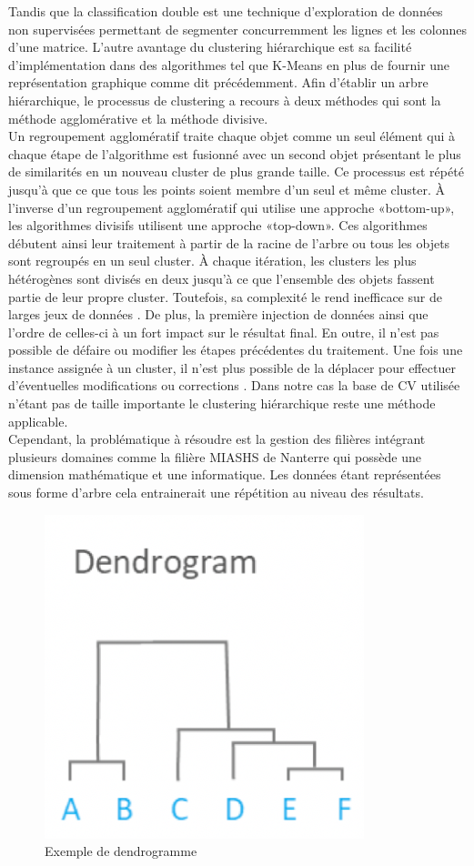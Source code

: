 \documentclass[memoire.tex]{subfiles}
\begin{document}
 Tandis que la classification double est une technique d'exploration de données non supervisées permettant de segmenter concurremment les lignes et les colonnes d'une matrice. L'autre avantage du clustering hiérarchique est sa facilité d'implémentation dans des algorithmes tel que K-Means en plus de fournir une représentation graphique comme dit précédemment. Afin d'établir un arbre hiérarchique, le processus de clustering a recours à deux méthodes qui sont la méthode agglomérative et la méthode divisive.\\ Un regroupement agglomératif traite chaque objet comme un seul élément qui à chaque étape de l'algorithme est fusionné avec un second objet présentant le plus de similarités en un nouveau cluster de plus grande taille. Ce processus est répété jusqu'à que ce que tous les points soient membre d'un seul et même cluster. À l'inverse d'un regroupement agglomératif qui utilise une approche «bottom-up», les algorithmes divisifs utilisent une approche «top-down». Ces algorithmes débutent ainsi leur traitement à partir de la racine de l'arbre ou tous les objets sont regroupés en un seul cluster. À chaque itération, les clusters les plus hétérogènes sont divisés en deux jusqu'à ce que l'ensemble des objets fassent partie de leur propre cluster. Toutefois, sa complexité le rend inefficace sur de larges jeux de données \cite{ref7}. De plus, la première injection de données ainsi que l'ordre de celles-ci  à un fort impact sur le résultat final. En outre, il n'est pas possible de défaire ou modifier les étapes précédentes du traitement. Une fois une instance assignée à un cluster, il n'est plus possible de la déplacer pour effectuer d'éventuelles modifications ou corrections \cite{ref5}. Dans notre cas la base de CV utilisée n'étant pas de taille importante le clustering hiérarchique reste une méthode applicable. \\Cependant, la problématique à résoudre est la gestion des filières intégrant plusieurs domaines comme la filière MIASHS de Nanterre qui possède une dimension mathématique et une informatique. Les données étant représentées sous forme d'arbre cela entrainerait une répétition au niveau des résultats.
	\begin{figure}[h!]
		\centerline{\includegraphics[scale=0.5]{img/hierarchical_clustering.png}}
		\caption{Exemple de dendrogramme}
	\end{figure}
	
\end{document}
